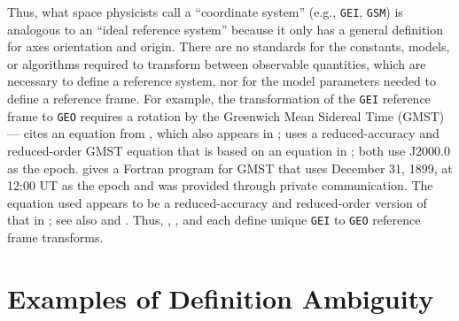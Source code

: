 \documentclass[draft]{agujournal2019}
\begin{document}


Thus, what space physicists call a ``coordinate system'' (e.g., \texttt{GEI}, \texttt{GSM}) is analogous to an ``ideal reference system'' because it only has a general definition for  axes orientation and origin. 
There are no standards for the constants, models, or algorithms required to transform between observable quantities, which are necessary to define a reference system, nor for the model parameters needed to define a reference frame. 
For example, the transformation of the \texttt{GEI} reference frame to \texttt{GEO} requires a rotation by the Greenwich Mean Sidereal Time (GMST) ---
 cites an equation from , which also appears in ;  uses a reduced-accuracy and reduced-order GMST equation that is based on an equation in ; both use J2000.0 as the epoch.  gives a Fortran program for GMST that uses December 31, 1899, at 12:00 UT as the epoch and was provided through private communication. The equation used appears to be a reduced-accuracy and reduced-order version of that in  ; see also   and . Thus, , , and  each define unique \texttt{GEI} to \texttt{GEO} reference frame transforms.

\section{Examples of Definition Ambiguity}
\label{sect:definitions}
\end{document}
